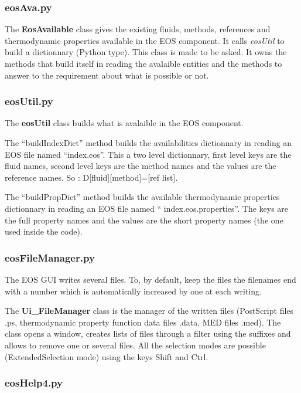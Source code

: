 \documentclass[10pt,a4paper]{article}
\begin{document}
\subsubsection{eosAva.py}

The \textbf{EosAvailable} class gives the existing fluids, methods, references and thermodynamic properties available in the EOS component. It calls \textit{eosUtil} to build a dictionnary (Python type). This class is made to be asked. It owns the methods that build itself in reading the avalaible entities and the methods to answer to the requirement about what is possible or not.

\subsubsection{eosUtil.py}

The \textbf{eosUtil} class builds what is avalaible in the EOS component.

The  ``buildIndexDict'' method builds the availabilities dictionnary in reading an EOS file named ``index.eos''. This a two level dictionnary, first level keys are the fluid names, second level keys are the method names and the values are the reference names. So : D[fluid][method]=[ref list].

The ``buildPropDict'' method builds the available thermodynamic properties dictionnary in reading an EOS file named `` index.eos.properties''. The keys are the full property names and the values are the short property names (the one used inside the code).

\subsubsection{eosFileManager.py}

The EOS GUI writes several files. To, by default, keep the files the filenames end with a number which is automatically increased by one at each writing.
 
The \textbf{Ui\_FileManager} class is the manager of the written files (PostScript files .ps, thermodynamic property function data files .data, MED files .med). The class opens a window, creates lists of files through a filter using the suffixes and allows to remove one or several files. All the selection modes are possible (ExtendedSelection mode) using the keys Shift and Ctrl. 

\subsubsection{eosHelp4.py}
\end{document}
